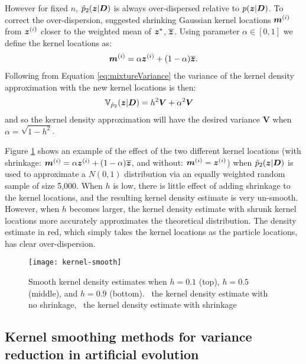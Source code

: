 However for fixed \(n\), \(\hat{p}_2(\boldsymbol{z} | \boldsymbol{D})\) is always over-dispersed relative to \(p(\boldsymbol{z} | \boldsymbol{D})\). To
correct the over-dispersion, \cite{West1993A} suggested shrinking Gaussian kernel locations \(\boldsymbol{m}^{(i)}\) from
\(\boldsymbol{z}^{(i)}\) closer to the weighted mean of \(\boldsymbol{z}^*\), \(\overline{\boldsymbol{z}}\). Using parameter \(\alpha \in [0,
1]\) we define the kernel locations as:
\begin{align}
\boldsymbol{m}^{(i)} = \alpha \boldsymbol{z}^{(i)} + (1 - \alpha) \overline{\boldsymbol{z}}.
\end{align}
Following from Equation \eqref{eq:mixtureVariance} the variance of the kernel density approximation with the new kernel
locations is then:
\begin{align} 
\mathbb{V}_{\hat{p}_2}(\boldsymbol{z} | \boldsymbol{D})  &= h^2 \boldsymbol{V} + \alpha^2 \boldsymbol{V}
\end{align}
and so the kernel density approximation will have the desired variance \(\boldsymbol{V}\) when \(\alpha = \sqrt{1 - h^2}\).

Figure \ref{fig:kernel} shows an example of the effect of the two different kernel locations (with shrinkage:
\(\boldsymbol{m}^{(i)} = \alpha \boldsymbol{z}^{(i)} + (1 - \alpha) \overline{\boldsymbol{z}}\), and without: \(\boldsymbol{m}^{(i)} = \boldsymbol{z}^{(i)}\))
when \(\hat{p}_2(\boldsymbol{z} | \boldsymbol{D})\) is used to approximate a \(N(0, 1)\) distribution via an equally weighted random
sample of size 5,000. When \(h\) is low, there is little effect of adding shrinkage to the kernel locations, and the
resulting kernel density estimate is very un-smooth. However, when \(h\) becomes larger, the kernel density estimate
with shrunk kernel locations more accurately approximates the theoretical distribution. The density estimate in red,
which simply takes the kernel locations as the particle locations, has clear over-dispersion.
\begin{figure}[htp]
\begin{center}
\texttt{[image: kernel-smooth]}
\caption{Smooth kernel density estimates when \(h = 0.1\) (top), \(h = 0.5\) (middle), and \(h = 0.9\) (bottom).
\protect\redSolidLine\ the kernel density estimate with no shrinkage, \protect\blueDashedLine\ the kernel density
estimate with shrinkage}
\label{fig:kernel}
\end{center}
\end{figure}

\subsection{Kernel smoothing methods for variance reduction in artificial evolution}
\label{sec:Kernel_smoothing_methods_for_variance_reduction_in_artificial_evolution}

